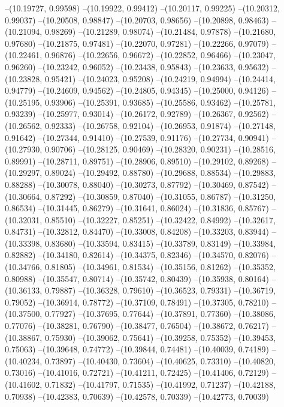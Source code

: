 --(10.19727, 0.99598)
--(10.19922, 0.99412)
--(10.20117, 0.99225)
--(10.20312, 0.99037)
--(10.20508, 0.98847)
--(10.20703, 0.98656)
--(10.20898, 0.98463)
--(10.21094, 0.98269)
--(10.21289, 0.98074)
--(10.21484, 0.97878)
--(10.21680, 0.97680)
--(10.21875, 0.97481)
--(10.22070, 0.97281)
--(10.22266, 0.97079)
--(10.22461, 0.96876)
--(10.22656, 0.96672)
--(10.22852, 0.96466)
--(10.23047, 0.96260)
--(10.23242, 0.96052)
--(10.23438, 0.95843)
--(10.23633, 0.95632)
--(10.23828, 0.95421)
--(10.24023, 0.95208)
--(10.24219, 0.94994)
--(10.24414, 0.94779)
--(10.24609, 0.94562)
--(10.24805, 0.94345)
--(10.25000, 0.94126)
--(10.25195, 0.93906)
--(10.25391, 0.93685)
--(10.25586, 0.93462)
--(10.25781, 0.93239)
--(10.25977, 0.93014)
--(10.26172, 0.92789)
--(10.26367, 0.92562)
--(10.26562, 0.92333)
--(10.26758, 0.92104)
--(10.26953, 0.91874)
--(10.27148, 0.91642)
--(10.27344, 0.91410)
--(10.27539, 0.91176)
--(10.27734, 0.90941)
--(10.27930, 0.90706)
--(10.28125, 0.90469)
--(10.28320, 0.90231)
--(10.28516, 0.89991)
--(10.28711, 0.89751)
--(10.28906, 0.89510)
--(10.29102, 0.89268)
--(10.29297, 0.89024)
--(10.29492, 0.88780)
--(10.29688, 0.88534)
--(10.29883, 0.88288)
--(10.30078, 0.88040)
--(10.30273, 0.87792)
--(10.30469, 0.87542)
--(10.30664, 0.87292)
--(10.30859, 0.87040)
--(10.31055, 0.86787)
--(10.31250, 0.86534)
--(10.31445, 0.86279)
--(10.31641, 0.86024)
--(10.31836, 0.85767)
--(10.32031, 0.85510)
--(10.32227, 0.85251)
--(10.32422, 0.84992)
--(10.32617, 0.84731)
--(10.32812, 0.84470)
--(10.33008, 0.84208)
--(10.33203, 0.83944)
--(10.33398, 0.83680)
--(10.33594, 0.83415)
--(10.33789, 0.83149)
--(10.33984, 0.82882)
--(10.34180, 0.82614)
--(10.34375, 0.82346)
--(10.34570, 0.82076)
--(10.34766, 0.81805)
--(10.34961, 0.81534)
--(10.35156, 0.81262)
--(10.35352, 0.80988)
--(10.35547, 0.80714)
--(10.35742, 0.80439)
--(10.35938, 0.80164)
--(10.36133, 0.79887)
--(10.36328, 0.79610)
--(10.36523, 0.79331)
--(10.36719, 0.79052)
--(10.36914, 0.78772)
--(10.37109, 0.78491)
--(10.37305, 0.78210)
--(10.37500, 0.77927)
--(10.37695, 0.77644)
--(10.37891, 0.77360)
--(10.38086, 0.77076)
--(10.38281, 0.76790)
--(10.38477, 0.76504)
--(10.38672, 0.76217)
--(10.38867, 0.75930)
--(10.39062, 0.75641)
--(10.39258, 0.75352)
--(10.39453, 0.75063)
--(10.39648, 0.74772)
--(10.39844, 0.74481)
--(10.40039, 0.74189)
--(10.40234, 0.73897)
--(10.40430, 0.73604)
--(10.40625, 0.73310)
--(10.40820, 0.73016)
--(10.41016, 0.72721)
--(10.41211, 0.72425)
--(10.41406, 0.72129)
--(10.41602, 0.71832)
--(10.41797, 0.71535)
--(10.41992, 0.71237)
--(10.42188, 0.70938)
--(10.42383, 0.70639)
--(10.42578, 0.70339)
--(10.42773, 0.70039)
